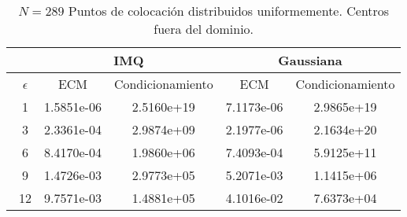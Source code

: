 \documentclass[11pt,a4paper]{article}
\begin{document}
\begin{table}[H]
\begin{center}
\caption{$N=289$ Puntos de colocación distribuidos uniformemente. Centros fuera del dominio.}
\begin{tabular}{|c|cc|cc|}
\hline
\ & \multicolumn{2}{|c|}{IMQ} & \multicolumn{2}{|c|}{Gaussiana} \\
\hline
\ $\epsilon$& ECM & Condicionamiento & ECM & Condicionamiento \\
\hline
\ 1 & 1.5851e-06   &2.5160e+19  & 7.1173e-06& 2.9865e+19\\
\ 3 &  2.3361e-04  &2.9874e+09 & 2.1977e-06& 2.1634e+20\\
\ 6 &  8.4170e-04  & 1.9860e+06&  7.4093e-04&5.9125e+11 \\
\ 9 & 1.4726e-03 &2.9773e+05& 5.2071e-03&1.1415e+06  \\
\ 12& 9.7571e-03&1.4881e+05  & 4.1016e-02&7.6373e+04 \\

\hline
\end{tabular}
\end{center}
\end{table}
\end{document}
